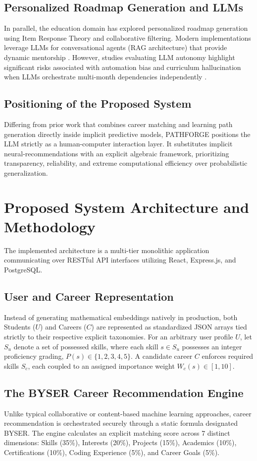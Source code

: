 \documentclass[conference]{IEEEtran}
\begin{document}
\subsection{Personalized Roadmap Generation and LLMs}
In parallel, the education domain has explored personalized roadmap generation using Item Response Theory and collaborative filtering. Modern implementations leverage LLMs for conversational agents (RAG architecture) that provide dynamic mentorship \cite{llm1}. However, studies evaluating LLM autonomy highlight significant risks associated with automation bias and curriculum hallucination when LLMs orchestrate multi-month dependencies independently \cite{xai1}. 

\subsection{Positioning of the Proposed System}
Differing from prior work that combines career matching and learning path generation directly inside implicit predictive models, PATHFORGE positions the LLM strictly as a human-computer interaction layer. It substitutes implicit neural-recommendations with an explicit algebraic framework, prioritizing transparency, reliability, and extreme computational efficiency over probabilistic generalization.

\section{Proposed System Architecture and Methodology}

The implemented architecture is a multi-tier monolithic application communicating over RESTful API interfaces utilizing React, Express.js, and PostgreSQL.

\subsection{User and Career Representation}
Instead of generating mathematical embeddings natively in production, both Students ($U$) and Careers ($C$) are represented as standardized JSON arrays tied strictly to their respective explicit taxonomies. For an arbitrary user profile $U$, let $S_u$ denote a set of possessed skills, where each skill $s \in S_u$ possesses an integer proficiency grading, $P(s) \in \{1, 2, 3, 4, 5\}$. A candidate career $C$ enforces required skills $S_c$, each coupled to an assigned importance weight $W_c(s) \in [1, 10]$.

\subsection{The BYSER Career Recommendation Engine}
Unlike typical collaborative or content-based machine learning approaches, career recommendation is orchestrated securely through a static formula designated BYSER. The engine calculates an explicit matching score across 7 distinct dimensions: Skills (35\%), Interests (20\%), Projects (15\%), Academics (10\%), Certifications (10\%), Coding Experience (5\%), and Career Goals (5\%).
\end{document}
